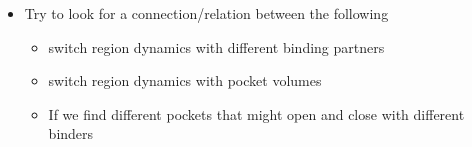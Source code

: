 \documentclass[12pt, a4paper]{achemso}
\begin{document}
\begin{itemize}
    \item Try to look for a connection/relation between the following
        \begin{itemize}
        \item switch region dynamics with different binding partners
        \item switch region dynamics with pocket volumes
        \item If we find different pockets that might open and close with different binders
        \end{itemize}
\end{itemize}





%



 
\end{document}
